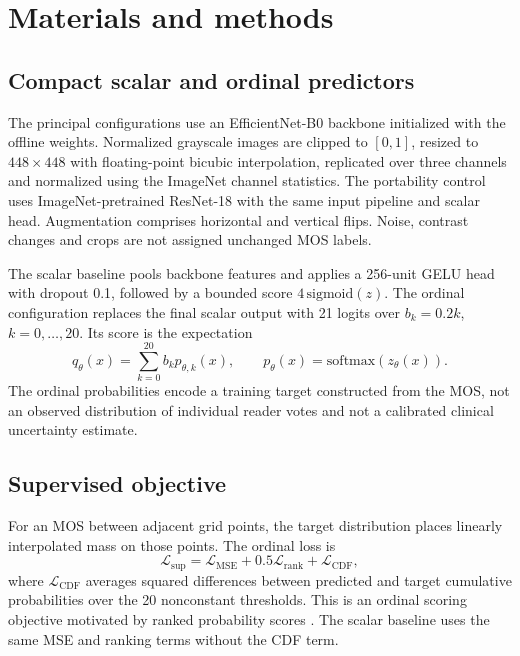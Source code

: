 \documentclass[11pt]{article}
\begin{document}
\section{Materials and methods}
\subsection{Compact scalar and ordinal predictors}
The principal configurations use an EfficientNet-B0 backbone \cite{efficientnet} initialized with the offline  weights. Normalized grayscale images are clipped to $[0,1]$, resized to $448\times448$ with floating-point bicubic interpolation, replicated over three channels and normalized using the ImageNet channel statistics. The portability control uses ImageNet-pretrained ResNet-18 with the same input pipeline and scalar head. Augmentation comprises horizontal and vertical flips. Noise, contrast changes and crops are not assigned unchanged MOS labels.

The scalar baseline pools backbone features and applies a 256-unit GELU head with dropout 0.1, followed by a bounded score $4\,\mathrm{sigmoid}(z)$. The ordinal configuration replaces the final scalar output with 21 logits over $b_k=0.2k$, $k=0,\ldots,20$. Its score is the expectation
\begin{equation}
 q_\theta(x)=\sum_{k=0}^{20}b_k p_{\theta,k}(x),\qquad
 p_\theta(x)=\mathrm{softmax}(z_\theta(x)).
\end{equation}
The ordinal probabilities encode a training target constructed from the MOS, not an observed distribution of individual reader votes and not a calibrated clinical uncertainty estimate.

\subsection{Supervised objective}
For an MOS between adjacent grid points, the target distribution places linearly interpolated mass on those points. The ordinal loss is
\begin{equation}
 \mathcal L_{\mathrm{sup}}=\mathcal L_{\mathrm{MSE}}
 +0.5\mathcal L_{\mathrm{rank}}+\mathcal L_{\mathrm{CDF}},
\end{equation}
where $\mathcal L_{\mathrm{CDF}}$ averages squared differences between predicted and target cumulative probabilities over the 20 nonconstant thresholds. This is an ordinal scoring objective motivated by ranked probability scores \cite{rps}. The scalar baseline uses the same MSE and ranking terms without the CDF term.
\end{document}
